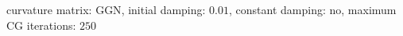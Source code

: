 curvature matrix: $\text{GGN}$, initial damping: $\num[scientific-notation=true]{0.01}$, constant damping: $\text{no}$, maximum CG iterations: $\num[scientific-notation=false]{250}$